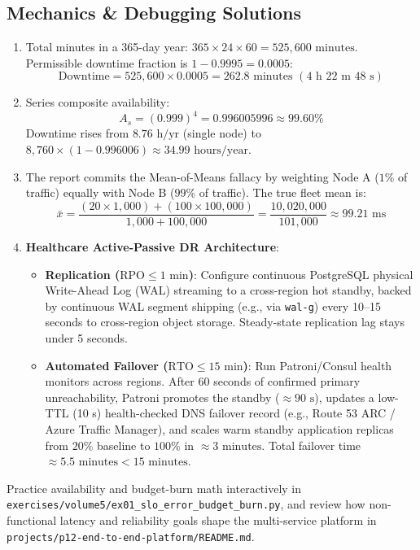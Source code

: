 \subsection*{Mechanics \& Debugging Solutions}
\begin{enumerate}[label=\textbf{Solution~\thechapter.\arabic*}, leftmargin=*]
  \item Total minutes in a 365-day year: $365 \times 24 \times 60 = 525,600\text{ minutes}$. Permissible downtime fraction is $1 - 0.9995 = 0.0005$:
  $$\text{Downtime} = 525,600 \times 0.0005 = 262.8\text{ minutes } (4\text{ h } 22\text{ m } 48\text{ s})$$
  \item Series composite availability:
  $$A_s = (0.999)^4 = 0.996005996 \approx 99.60\%$$
  Downtime rises from $8.76\text{ h/yr}$ (single node) to $8,760 \times (1 - 0.996006) \approx 34.99\text{ hours/year}$.
  \item The report commits the Mean-of-Means fallacy by weighting Node A ($1\%$ of traffic) equally with Node B ($99\%$ of traffic). The true fleet mean is:
  $$\bar{x} = \frac{(20 \times 1,000) + (100 \times 100,000)}{1,000 + 100,000} = \frac{10,020,000}{101,000} \approx 99.21\text{ ms}$$
  \item \textbf{Healthcare Active-Passive DR Architecture}:
  \begin{itemize}[leftmargin=14pt]
    \item \textbf{Replication ($\text{RPO} \le 1\text{ min}$)}: Configure continuous PostgreSQL physical Write-Ahead Log (WAL) streaming to a cross-region hot standby, backed by continuous WAL segment shipping (e.g., via \texttt{wal-g}) every 10--15 seconds to cross-region object storage. Steady-state replication lag stays under 5 seconds.
    \item \textbf{Automated Failover ($\text{RTO} \le 15\text{ min}$)}: Run Patroni/Consul health monitors across regions. After 60 seconds of confirmed primary unreachability, Patroni promotes the standby ($\approx 90\text{ s}$), updates a low-TTL (10 s) health-checked DNS failover record (e.g., Route 53 ARC / Azure Traffic Manager), and scales warm standby application replicas from $20\%$ baseline to $100\%$ in $\approx 3\text{ minutes}$. Total failover time $\approx 5.5\text{ minutes} < 15\text{ minutes}$.
  \end{itemize}
\end{enumerate}

\begin{labbridgebox}
Practice availability and budget-burn math interactively in \texttt{exercises/volume5/ex01\_slo\_error\_budget\_burn.py}, and review how non-functional latency and reliability goals shape the multi-service platform in \texttt{projects/p12-end-to-end-platform/README.md}.
\end{labbridgebox}


